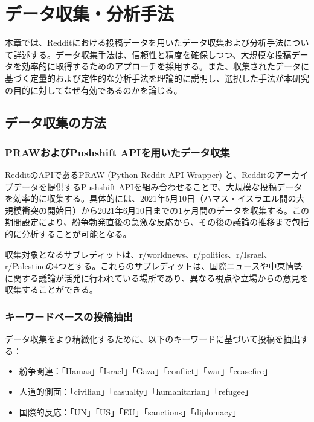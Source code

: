 \documentclass[11pt, a4j]{jreport}
\begin{document}
    \chapter{データ収集・分析手法}
    本章では、Redditにおける投稿データを用いたデータ収集および分析手法について詳述する。データ収集手法は、信頼性と精度を確保しつつ、大規模な投稿データを効率的に取得するためのアプローチを採用する。また、収集されたデータに基づく定量的および定性的な分析手法を理論的に説明し、選択した手法が本研究の目的に対してなぜ有効であるのかを論じる。

    \section{データ収集の方法}
    \subsection{PRAWおよびPushshift APIを用いたデータ収集}
    RedditのAPIであるPRAW (Python Reddit API Wrapper) と、Redditのアーカイブデータを提供するPushshift
    APIを組み合わせることで、大規模な投稿データを効率的に収集する。具体的には、2021年5月10日（ハマス・イスラエル間の大規模衝突の開始日）から2021年6月10日までの1ヶ月間のデータを収集する。この期間設定により、紛争勃発直後の急激な反応から、その後の議論の推移まで包括的に分析することが可能となる。

    収集対象となるサブレディットは、r/worldnews、r/politics、r/Israel、r/Palestineの4つとする。これらのサブレディットは、国際ニュースや中東情勢に関する議論が活発に行われている場所であり、異なる視点や立場からの意見を収集することができる。

    \subsection{キーワードベースの投稿抽出}
    データ収集をより精緻化するために、以下のキーワードに基づいて投稿を抽出する：

    \begin{itemize}
        \item 紛争関連：「Hamas」「Israel」「Gaza」「conflict」「war」「ceasefire」

        \item 人道的側面：「civilian」「casualty」「humanitarian」「refugee」

        \item 国際的反応：「UN」「US」「EU」「sanctions」「diplomacy」
    \end{itemize}
\end{document}
